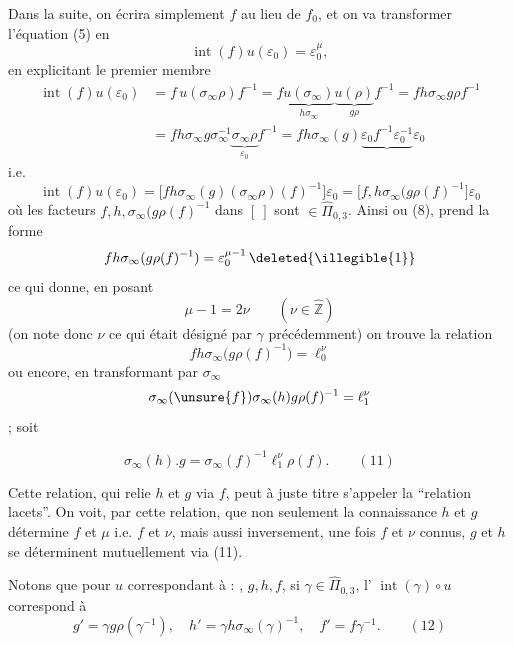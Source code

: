 Dans la suite, on écrira simplement $f$ au lieu de $f_0$, et on va transformer l'équation (5)  en
\[
\tag{8bis}
\operatorname{int}(f)u(\varepsilon_0)=\varepsilon_0^\mu,
\]
en explicitant le premier membre
\[
\begin{aligned}
\operatorname{int}(f)u(\varepsilon_0)
&=f\,u(\sigma_\infty\rho)f^{-1}
=f\underbrace{u(\sigma_\infty)}_{h\sigma_\infty}\underbrace{u(\rho)}_{g\rho}f^{-1}
=fh\sigma_\infty g\rho f^{-1}\\
&=fh\sigma_\infty g\sigma_\infty^{-1}\underbrace{\sigma_\infty\rho}_{\varepsilon_0}f^{-1}
=fh\sigma_\infty(g)\underbrace{\varepsilon_0f^{-1}\varepsilon_0^{-1}}\varepsilon_0
\end{aligned}
\]
i.e.
\[
\tag{9}
\operatorname{int}(f)u(\varepsilon_0)
=\bigl[fh\sigma_\infty(g)(\sigma_\infty\rho)(f)^{-1}\bigr]\varepsilon_0
=\bigl[f,h\sigma_\infty(g\rho(f)^{-1}\bigr]\varepsilon_0
\]
où les  facteurs $f,h,\sigma_\infty(g\rho(f)^{-1}$ dans $[\ ]$ sont $\in\widehat{\Pi}_{0,3}$. Ainsi  ou (8), prend la forme
\[
fh\sigma_\infty(g\rho(f)^{-1})=\varepsilon_0^{\mu-1}\,\deleted{\illegible{1}}
\]
ce qui donne, en posant
\[
\tag{10}
\mu-1=2\nu\qquad(\nu\in\widehat{\mathbb Z})
\]
(on note donc $\nu$ ce qui était désigné par $\gamma$ précédemment) on trouve la relation
\[
fh\sigma_\infty\bigl(g\rho(f)^{-1}\bigr)=\ell_0^\nu
\]
ou encore, en transformant par $\sigma_\infty$
\[
\sigma_\infty(\unsure{f})\sigma_\infty(h)g\rho(f)^{-1}=\ell_1^\nu
\]
; soit



\[
\boxed{\sigma_\infty(h).g=\sigma_\infty(f)^{-1}\ell_1^\nu\rho(f)}.
\qquad (11)
\]

Cette relation, qui relie $h$ et $g$ via $f$, peut à juste titre s'appeler la ``relation lacets''.
On voit, par cette relation, que  non seulement la connaissance   $h$ et $g$ détermine $f$ et $\mu$ i.e. $f$ et $\nu$, mais aussi inversement, une fois $f$ et $\nu$ connus, $g$ et $h$ se déterminent mutuellement via (11).


Notons que pour $u$ correspondant à : , $g,h,f$, si $\gamma\in\widehat{\Pi}_{0,3}$, l'  $\operatorname{int}(\gamma)\circ u$ correspond à
\[
g'=\gamma g\rho(\gamma^{-1}),\quad
h'=\gamma h\sigma_\infty(\gamma)^{-1},\quad
f'=f\gamma^{-1}.
\qquad (12)
\]

